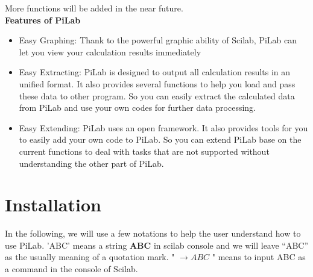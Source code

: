 \documentclass[10pt,a4paper]{article}
\begin{document}
More functions will be added in the near future. \\

\textbf{Features of PiLab}
\begin{itemize}
\item Easy Graphing: Thank to the powerful graphic ability of Scilab, PiLab can let you view your calculation results immediately
\item Easy Extracting: PiLab is designed to output all calculation results in an unified format. It also provides several functions to help you load and pass these data to other program. So you can easily extract the calculated data from PiLab and use your own codes for further data processing. 
\item Easy Extending: PiLab uses an open framework. It also provides tools for you to easily add your own code to PiLab. So you can extend PiLab base on the current functions to deal with tasks that are not supported without understanding the other part of PiLab.
\end{itemize}

\section{Installation}
In the following, we will use a few notations to help the user understand how to use PiLab. 'ABC' means a string \textbf{ABC} in scilab console and we will leave ``ABC'' as the usually meaning of a quotation mark. " $\rightarrow ABC$ " means to input ABC as a command in the console of Scilab. 
\end{document}
